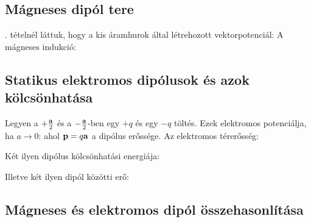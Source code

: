   \subsection{Mágneses dipól tere}
  . tételnél láttuk, hogy a kis áramhurok által létrehozott vektorpotenciál:
  A mágneses indukció:
  
  \subsection{Statikus elektromos dipólusok és azok kölcsönhatása}\label{ss:A06-dipol}
   
   Legyen a $+\frac{\mathbf{a}}{2}$ és a $-\frac{\mathbf{a}}{2}$-ben egy $+q$ és egy $-q$ töltés. Ezek elektromos potenciálja, ha $a\to0$:
   ahol $\mathbf{p}=q\mathbf{a}$ a dipólus erőssége. Az elektromos térerősség:
   
   Két ilyen dipólus kölcsönhatási energiája: 
   
   Illetve két ilyen dipól közötti erő:
   
  \subsection{Mágneses és elektromos dipól összehasonlítása}
   
